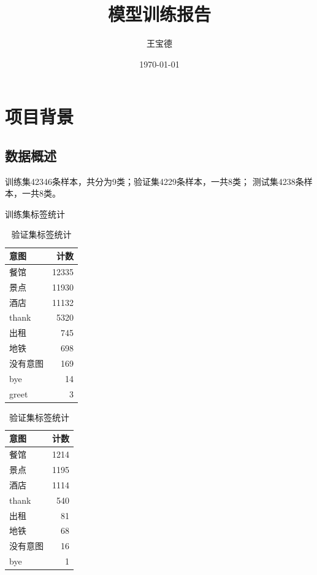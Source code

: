 \documentclass{article}
\title{模型训练报告}
\author{王宝德}
\date{\today}
\begin{document}
	
\maketitle

\tableofcontents
\newpage

\section{项目背景}

\subsection{数据概述}
训练集42346条样本，共分为9类；验证集4229条样本，一共8类； 测试集4238条样本，一共8类。
	
\begin{table}[h!]
	\centering
	\begin{minipage}[b]{0.25\textwidth}
		\centering
		\caption{训练集标签统计}
		\begin{tabular}{|l|r|}
			\hline
			\textbf{意图} & \textbf{计数} \\
			\hline
			餐馆 & 12335 \\
			景点 & 11930 \\
			酒店 & 11132 \\
			thank & 5320 \\
			出租 & 745 \\
			地铁 & 698 \\
			没有意图 & 169 \\
			bye & 14 \\
			greet & 3 \\
			\hline
		\end{tabular}
		
	\end{minipage}
	\hspace{0.05\textwidth} %
	\begin{minipage}[b]{0.3\textwidth}
		\centering
		\caption{验证集标签统计}
		    \begin{tabular}{|l|r|}
			\hline
			\textbf{意图} & \textbf{计数} \\
			\hline
			餐馆 & 1214 \\
			景点 & 1195 \\
			酒店 & 1114 \\
			thank & 540 \\
			出租 & 81 \\
			地铁 & 68 \\
			没有意图 & 16 \\
			bye & 1 \\
			\hline
		\end{tabular}


\end{minipage}
\end{table}
\end{document}

